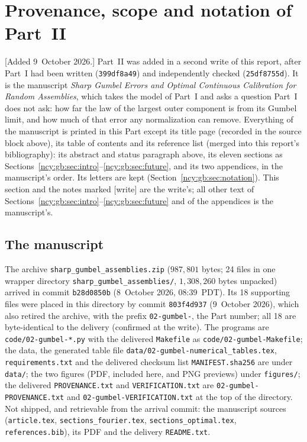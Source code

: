 \documentclass[11pt,letterpaper]{article}
\numberwithin{equation}{section}
\theoremstyle{remark}\newtheorem{remark}[theorem]{Remark}
\newcommand{\file}[1]{\nolinkurl{#1}}
\theoremstyle{definition}\newtheorem{definition}[theorem]{Definition}\theoremstyle{plain}
\begin{document}
\section{Provenance, scope and notation of Part~II}\label{ncy:gb:sec:front}

[Added 9~October 2026.] Part~II was added in a second write of this report,
after Part~I had been written (\file{399df8a49}) and independently checked
(\file{25df8755d}). It is the manuscript \emph{Sharp Gumbel Errors and
Optimal Continuous Calibration for Random Assemblies}, which takes the model
of Part~I and asks a question Part~I does not ask: how far the law of the
largest outer component is from its Gumbel limit, and how much of that error
any normalization can remove. Everything of the manuscript is printed in this
Part except its title page (recorded in the source block above), its table of
contents and its reference list (merged into this report's bibliography): its
abstract and status paragraph above, its eleven sections as
Sections~\ref{ncy:gb:sec:intro}--\ref{ncy:gb:sec:future}, and its two
appendices, in the manuscript's order. Its letters are kept
(Section~\ref{ncy:gb:sec:notation}). This section and the notes marked
[write] are the write's; all other text of
Sections~\ref{ncy:gb:sec:intro}--\ref{ncy:gb:sec:future} and of the
appendices is the manuscript's.

\subsection{The manuscript}\label{ncy:gb:sec:provenance}

The archive \file{sharp_gumbel_assemblies.zip} ($987{,}801$ bytes; 24 files
in one wrapper directory \file{sharp_gumbel_assemblies/},
$1{,}308{,}260$ bytes unpacked) arrived in commit \file{b28d0850b}
(8~October 2026, 08:39~PDT). Its 18 supporting files were placed in this
directory by commit \file{803f4d937} (9~October 2026), which also retired the
archive, with the prefix \file{02-gumbel-}, the Part number; all 18 are
byte-identical to the delivery (confirmed at the write). The programs are
\file{code/02-gumbel-*.py} with the delivered \file{Makefile} as
\file{code/02-gumbel-Makefile}; the data, the generated table file
\file{data/02-gumbel-numerical_tables.tex}, \file{requirements.txt} and the
delivered checksum list \file{MANIFEST.sha256} are under \file{data/}; the two
figures (PDF, included here, and PNG previews) under \file{figures/}; the
delivered \file{PROVENANCE.txt} and \file{VERIFICATION.txt} are
\file{02-gumbel-PROVENANCE.txt} and \file{02-gumbel-VERIFICATION.txt} at the
top of the directory. Not shipped, and retrievable from the arrival commit:
the manuscript sources (\file{article.tex}, \file{sections_fourier.tex},
\file{sections_optimal.tex}, \file{references.bib}), its PDF and the delivery
\file{README.txt}.
\end{document}
